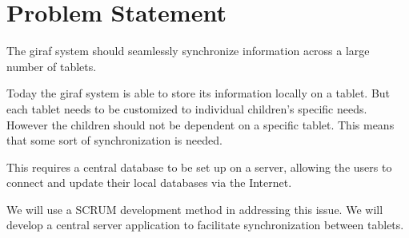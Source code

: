 \section{Problem Statement}
The \ac{giraf} system should seamlessly synchronize information across a large number of tablets.

Today the \ac{giraf} system is able to store its information locally on a tablet. But each tablet needs to be customized to individual children's specific needs. However the children should not be dependent on a specific tablet. This means that some sort of synchronization is needed.

This requires a central database to be set up on a server, allowing the users to connect and update their local databases via the Internet. 

We will use a SCRUM development method in addressing this issue. We will develop a central server application to facilitate synchronization between tablets.